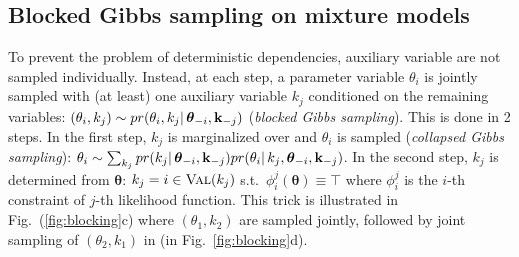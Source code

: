\subsection{Blocked Gibbs sampling on mixture models}
\label{sect:collapsed}
To prevent the problem of deterministic dependencies, auxiliary variable are not sampled individually. 
Instead, at each step, a parameter variable $\theta_i$ is jointly sampled with  
(at least) one  
auxiliary variable $k_j$ 
conditioned on the remaining variables:
$
(\theta_i, k_j) \sim pr(\theta_i, k_j | \, \boldsymbol \theta_{-i}, \textbf{k}_{-j})  
$
(\emph{blocked Gibbs sampling}).
This is done in 2 steps. In the first step, $k_j$ is marginalized over and $\theta_i$ is sampled (\emph{collapsed Gibbs sampling}):
$
\theta_i \sim \sum_{k_j} 
pr(k_j | \, \boldsymbol \theta_{-i}, \textbf{k}_{-j}) 
pr(\theta_i | \, k_j, \boldsymbol \theta_{-i}, \textbf{k}_{-j})  
$.
In the second step, $k_j$ is determined from $\boldsymbol \theta$:
$k_j = i \in \textsc{Val}(k_j)$ s.t.\ $\phi_i^j(\boldsymbol \theta) \equiv \top$
where $\phi_i^j$ is the $i$-th constraint of $j$-th likelihood function.
This trick is illustrated in Fig.~(\ref{fig:blocking}c) where $(\theta_1, k_2)$ are sampled jointly,
followed by joint sampling of $(\theta_2, k_1)$ in (in Fig.~\ref{fig:blocking}d). 

